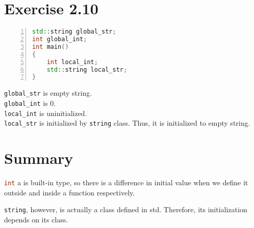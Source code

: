 \documentclass{article}
\begin{document}
\section*{Exercise 2.10}

\begin{lstlisting}[numbers=left, basicstyle=\ttfamily, language=C++, xleftmargin=2em]
std::string global_str; 
int global_int; 
int main() 
{ 
    int local_int; 
    std::string local_str; 
}
\end{lstlisting}

\begin{flushleft}
\lstinline[language=C++]|global_str| is empty string. \\
\lstinline[language=C++]|global_int| is 0. \\
\lstinline[language=C++]|local_int| is uninitialized. \\
\lstinline[language=C++]|local_str| is initialized by \lstinline[language=C++]|string| class. Thus,
it is initialized to empty string. \linebreak

\section*{Summary}

\lstinline[language=C++]|int| a is built-in type, so there is a difference in initial value when we define it outside and inside a function respectively. \linebreak

\lstinline[language=C++]|string|, however, is actually a class defined in std. Therefore, its initialization depends on its class.
\end{flushleft}
\end{document}
